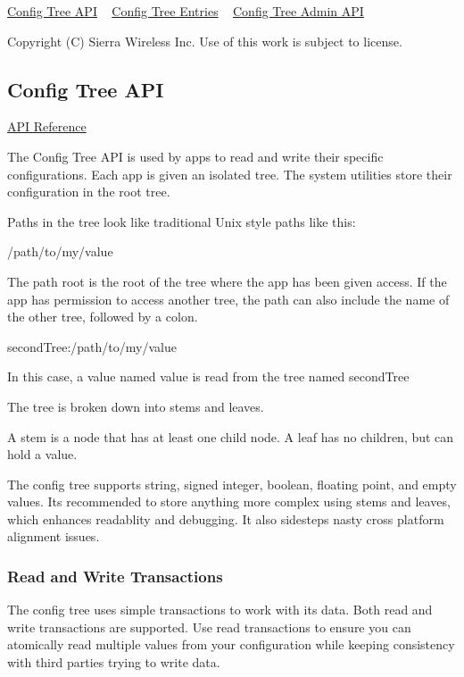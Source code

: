 \hyperlink{c_config}{Config Tree A\+P\+I} ~\newline
 \hyperlink{configTreePage}{Config Tree Entries} ~\newline
 \hyperlink{c_configAdmin}{Config Tree Admin A\+P\+I}





Copyright (C) Sierra Wireless Inc. Use of this work is subject to license. \hypertarget{c_config}{}\subsection{Config Tree A\+P\+I}\label{c_config}
\hyperlink{le__cfg__interface_8h}{A\+P\+I Reference}





The Config Tree A\+P\+I is used by apps to read and write their specific configurations. Each app is given an isolated tree. The system utilities store their configuration in the {\ttfamily root} tree.

Paths in the tree look like traditional Unix style paths like this\+:


\begin{DoxyCode}
/path/to/my/value 
\end{DoxyCode}


The path root is the root of the tree where the app has been given access. If the app has permission to access another tree, the path can also include the name of the other tree, followed by a colon.


\begin{DoxyCode}
secondTree:/path/to/my/value 
\end{DoxyCode}


In this case, a value named {\ttfamily value} is read from the tree named {\ttfamily second\+Tree} 

The tree is broken down into stems and leaves.

A stem is a node that has at least one child node. A leaf has no children, but can hold a value.

The config tree supports string, signed integer, boolean, floating point, and empty values. It\textquotesingle{}s recommended to store anything more complex using stems and leaves, which enhances readablity and debugging. It also sidesteps nasty cross platform alignment issues.\hypertarget{c_config_cfg_transaction}{}\subsubsection{Read and Write Transactions}\label{c_config_cfg_transaction}
The config tree uses simple transactions to work with its data. Both read and write transactions are supported. Use read transactions to ensure you can atomically read multiple values from your configuration while keeping consistency with third parties trying to write data.

